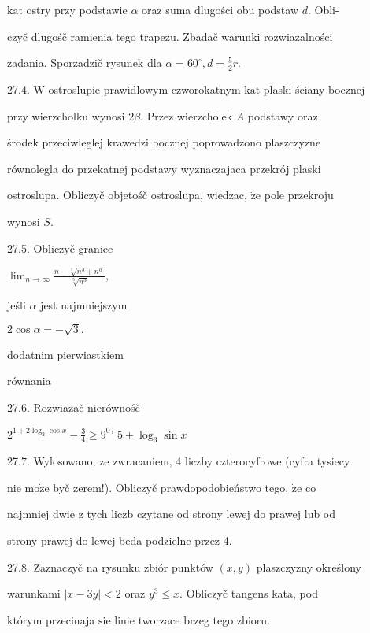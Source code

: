 \documentclass[a4paper,12pt]{article}
\begin{document}
$\mathrm{k}\mathrm{a}\mathrm{t}$ ostry przy podstawie $\alpha$ oraz suma dlugości obu podstaw $d$. Obli-

czyč dlugośč ramienia tego trapezu. Zbadač warunki rozwiazalności

zadania. Sporzadzič rysunek dla $\alpha=60^{\circ}, d=\displaystyle \frac{5}{2}r.$

27.4. $\mathrm{W}$ ostroslupie prawidlowym czworokatnym $\mathrm{k}\mathrm{a}\mathrm{t}$ plaski ściany bocznej

przy wierzcholku wynosi $ 2\beta$. Przez wierzcholek $A$ podstawy oraz

środek przeciwleglej krawedzi bocznej poprowadzono plaszczyzne

równolegla do przekatnej podstawy wyznaczajaca przekrój plaski

ostroslupa. Obliczyč objetośč ostroslupa, wiedzac, $\dot{\mathrm{z}}\mathrm{e}$ pole przekroju

wynosi $S.$

27.5. Obliczyč granice

$\displaystyle \lim_{n\rightarrow\infty}\frac{n-\sqrt[3]{n^{3}+n^{\alpha}}}{\sqrt[5]{n^{3}}},$

jeśli $\alpha$ jest najmniejszym

$2\cos\alpha=-\sqrt{3}.$

dodatnim pierwiastkiem

równania

27.6. Rozwiazač nierównośč

$2^{1+2\log_{2}\cos x}-\displaystyle \frac{3}{4}\geq 9^{0}$' $5+\log_{3}\sin x$

27.7. Wylosowano, ze zwracaniem, 4 liczby czterocyfrowe (cyfra tysiecy

nie $\mathrm{m}\mathrm{o}\dot{\mathrm{z}}\mathrm{e}$ byč zerem!). Obliczyč prawdopodobieństwo tego, $\dot{\mathrm{z}}\mathrm{e}$ co

najmniej dwie $\mathrm{z}$ tych liczb czytane od strony lewej do prawej lub od

strony prawej do lewej beda podzielne przez 4.

27.8. Zaznaczyč na rysunku zbiór punktów $(x,y)$ plaszczyzny określony

warunkami $|x-3y| < 2$ oraz $y^{3} \leq x$. Obliczyč tangens kata, pod

którym przecinaja $\mathrm{s}\mathrm{i}\mathrm{e}$ linie tworzace brzeg tego zbioru.
\end{document}

